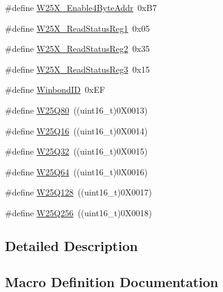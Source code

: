 \begin{DoxyCompactItemize}
\item 
\#define \mbox{\hyperlink{group___w25_x___exported___defines_ga2210f7e5ac7720dda5701affa27f2390}{W25\+X\+\_\+\+Enable4\+Byte\+Addr}}~0x\+B7
\item 
\#define \mbox{\hyperlink{group___w25_x___exported___defines_ga8c951b80f979d8db6eb54a7f326eca2a}{W25\+X\+\_\+\+Read\+Status\+Reg1}}~0x05
\item 
\#define \mbox{\hyperlink{group___w25_x___exported___defines_ga4f040641a4c2a63468dd376291f59518}{W25\+X\+\_\+\+Read\+Status\+Reg2}}~0x35
\item 
\#define \mbox{\hyperlink{group___w25_x___exported___defines_gafabcd6a9a57130217d91673d9821005e}{W25\+X\+\_\+\+Read\+Status\+Reg3}}~0x15
\item 
\#define \mbox{\hyperlink{group___w25_x___exported___defines_ga8446738dd1b4b2f009d9f9ac76e4f1fc}{Winbond\+ID}}~0x\+EF
\item 
\#define \mbox{\hyperlink{group___w25_x___exported___defines_gabbd77b02695cf2d0c6e0ff52ec9af93c}{W25\+Q80}}~((uint16\+\_\+t)0\+X0013)
\item 
\#define \mbox{\hyperlink{group___w25_x___exported___defines_ga6869d6cf138e4ddb4e07cd8d41c21318}{W25\+Q16}}~((uint16\+\_\+t)0\+X0014)
\item 
\#define \mbox{\hyperlink{group___w25_x___exported___defines_ga723a6cfddec80ee349e67620fc5ddfca}{W25\+Q32}}~((uint16\+\_\+t)0\+X0015)
\item 
\#define \mbox{\hyperlink{group___w25_x___exported___defines_gabd6e5e44961f152076aa7a92211eea8d}{W25\+Q64}}~((uint16\+\_\+t)0\+X0016)
\item 
\#define \mbox{\hyperlink{group___w25_x___exported___defines_ga00da1b8574780a02ac048860e77c3e45}{W25\+Q128}}~((uint16\+\_\+t)0\+X0017)
\item 
\#define \mbox{\hyperlink{group___w25_x___exported___defines_gaa515df81c8800e36366e343387468376}{W25\+Q256}}~((uint16\+\_\+t)0\+X0018)
\end{DoxyCompactItemize}


\subsection{Detailed Description}


\subsection{Macro Definition Documentation}
\mbox{\label{group___w25_x___exported___defines_gadc81a065700d3af56b6fb631585e3641}} 
